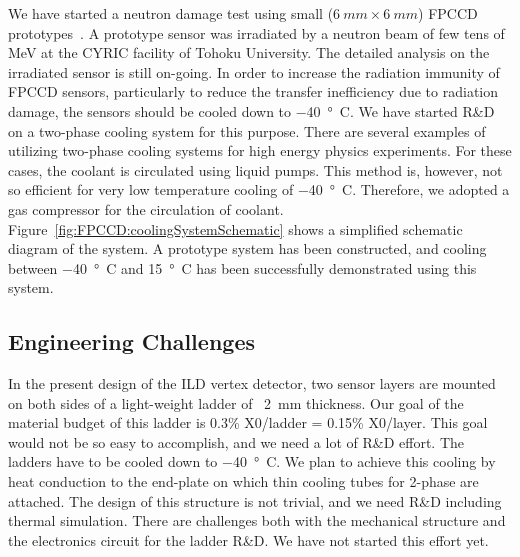 We have started a neutron damage test using small ($\SI{6}{mm}\times\SI{6}{mm}$) FPCCD prototypes~\cite{lcws:fpccd:ito:2013}. A prototype sensor was irradiated by a neutron beam of few tens of MeV at the CYRIC facility of Tohoku University. The detailed analysis on the irradiated sensor is still on-going.
In order to increase the radiation immunity of FPCCD sensors, particularly to reduce the transfer inefficiency due to radiation damage, the sensors should be cooled down to \SI{-40}{\degree C}. We have started R\&D on a two-phase  cooling system for this purpose. There are several examples of utilizing two-phase  cooling systems for high energy physics experiments. For these cases, the  coolant is circulated using liquid pumps. This method is, however, not so efficient for very low temperature cooling of \SI{-40}{\degree C}. Therefore, we adopted a  gas compressor for the circulation of  coolant. Figure~\ref{fig:FPCCD:coolingSystemSchematic} shows a simplified schematic diagram of the system. A prototype system has been constructed, and cooling between \SI{-40}{\degree C} and \SI{+15}{\degree C} has been successfully demonstrated using this system.

\subsection{Engineering Challenges}
    In the present design of the ILD vertex detector, two sensor layers are mounted on both sides of a light-weight ladder of ~\SI{2}{mm} thickness. Our goal of the material budget of this ladder is 0.3\% X0/ladder = 0.15\% X0/layer. This goal would not be so easy to accomplish, and we need a lot of R\&D effort.
    The ladders have to be cooled down to \SI{-40}{\degree C}. We plan to achieve this cooling by heat conduction to the end-plate on which thin cooling tubes for 2-phase  are attached. The design of this structure is not trivial, and we need R\&D including thermal simulation.
    There are challenges both with the mechanical structure and the electronics circuit for the ladder R\&D. We have not started this effort yet.

